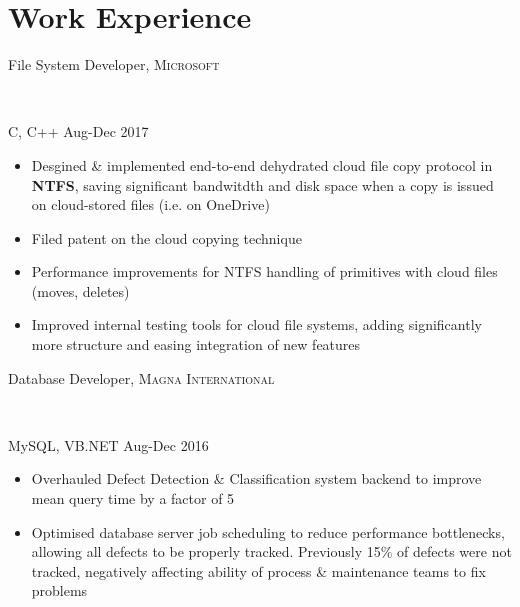 \documentclass[letterpaper,10pt]{article}
\newcommand{\comment}[1]{}
\begin{document}
\begin{minipage}[t]{0.6\textwidth} %

\section{Work Experience}
\medskip

\begin{large}
File System Developer, \textsc{Microsoft}
\end{large}\\
\medskip
\begin{footnotesize}
C, C++ \hfill Aug-Dec 2017
\end{footnotesize}
\begin{itemize}
    \item {Desgined \& implemented end-to-end dehydrated cloud file copy protocol in \textbf{NTFS}, saving significant bandwitdth and disk space when a copy is issued on cloud-stored files (i.e. on OneDrive)}
    \item {Filed patent on the cloud copying technique}   %
    \item {Performance improvements for NTFS handling of primitives with cloud files (moves, deletes)}
    \item {Improved internal testing tools for cloud file systems, adding significantly more structure and easing integration of new features}
\end{itemize}
\bigskip

\begin{large}
Database Developer, \textsc{Magna International}
\end{large}\\
\medskip
\begin{footnotesize}
MySQL, VB.NET \hfill Aug-Dec 2016
\end{footnotesize}
\begin{itemize}
    \item {Overhauled Defect Detection \& Classification system backend to improve mean query time by a factor of 5}
    \item {Optimised database server job scheduling to reduce performance bottlenecks, allowing all defects to be properly tracked. Previously 15\% of defects were not tracked, negatively affecting ability of process \& maintenance teams to fix problems}
\comment{    \item {Implemented automatic reconnection for dropped mould HMI connections, saving 10 man-hours per week}}
\end{itemize}
\bigskip


\end{minipage}
\end{document}
